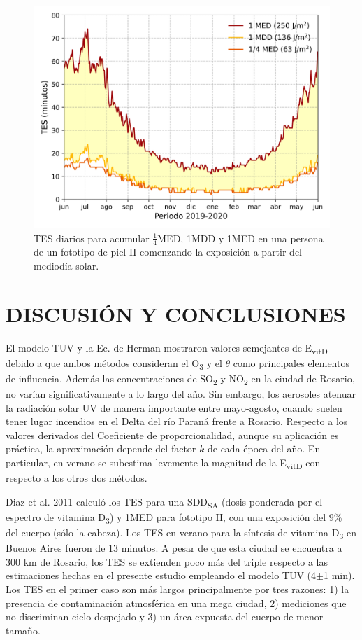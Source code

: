 \documentclass[10pt,twocolumn]{article}
\begin{document}
\begin{figure}[ht]
  \centering
  \includegraphics[scale=0.47]{dosis_vitamin.png}
  \caption{TES diarios para acumular $\frac{1}{4}$MED, 1MDD y 1MED en una persona de un fototipo de piel II comenzando la exposición a partir del mediodía solar.}
  \label{fig:TES}
\end{figure}

\section{DISCUSIÓN Y CONCLUSIONES}
El modelo TUV y la Ec. de Herman mostraron valores semejantes de E\textsubscript{vitD} debido a que ambos métodos consideran el O\textsubscript{3} y el $\theta$ como principales elementos de influencia. Además las concentraciones de SO\textsubscript{2} y NO\textsubscript{2} en la ciudad de Rosario, no varían significativamente a lo largo del año. Sin embargo, los aerosoles atenuar la radiación solar UV de manera importante entre mayo-agosto, cuando suelen tener lugar incendios en el Delta del río Paraná frente a Rosario.\cite{IPINA2012966} Respecto a los valores derivados del Coeficiente de proporcionalidad, aunque su aplicación es práctica, la aproximación depende del factor $k$ de cada época del año. En particular, en verano se subestima levemente la magnitud de la E\textsubscript{vitD} con respecto a los otros dos métodos.

Diaz et al. 2011 calculó los TES para una SDD\textsubscript{SA} (dosis ponderada por el espectro de vitamina D\textsubscript{3}) y 1MED para fototipo II, con una exposición del 9\% del cuerpo (sólo la cabeza). Los TES en verano para la síntesis de vitamina D\textsubscript{3} en Buenos Aires fueron de 13 minutos. A pesar de que esta ciudad se encuentra a 300 km de Rosario, los TES se extienden poco más del triple respecto a las estimaciones hechas en el presente estudio empleando el modelo TUV (4$\pm$1 min). Los TES en el primer caso son más largos principalmente por tres razones: 1) la presencia de contaminación atmosférica en una mega ciudad, 2) mediciones que no discriminan cielo despejado y 3) un área expuesta del cuerpo de menor tamaño.
\end{document}
